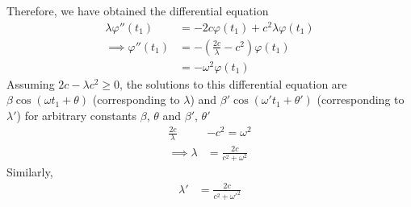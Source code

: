\documentclass{beamer}
\providecommand{\brak}[1]{\ensuremath{\left(#1\right)}}
\begin{document}
	\begin{frame}
	Therefore, we have obtained the differential equation
	\begin{align}
		\lambda\varphi''(t_1) &= -2c\varphi(t_1) + c^2\lambda\varphi(t_1) \\
		\implies \varphi''(t_1) &= -\brak{\frac{2c}{\lambda} - c^2}\varphi(t_1) \\
		&= -\omega^2 \varphi(t_1)
	\end{align}
	Assuming $2c - \lambda c^2 \ge 0$, the solutions to this differential equation are $\beta \cos(\omega t_1 + \theta)$ (corresponding to $\lambda$) and $\beta' \cos(\omega' t_1 + \theta')$ (corresponding to $\lambda'$)
	for arbitrary constants $\beta$, $\theta$ and $\beta'$, $\theta'$
	\begin{align}
		\frac{2c}{\lambda} &- c^2 = \omega^2 \\
		\implies \lambda &= \frac{2c}{c^2+\omega^2} 
	\end{align}
	Similarly,
	\begin{align}
		\lambda' &= \frac{2c}{c^2+\omega'^2} 
	\end{align}
	\end{frame}
\end{document}
